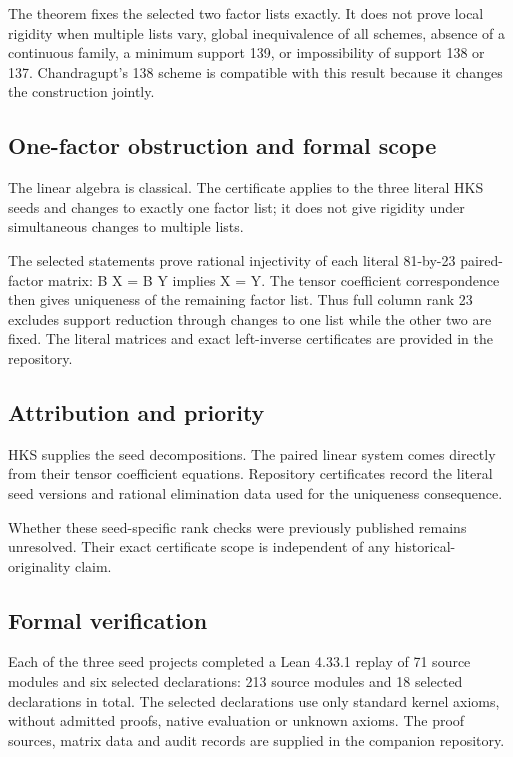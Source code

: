 \documentclass[11pt,a4paper]{article}
\begin{document}
The theorem fixes the selected two factor lists exactly. It does not prove local rigidity when multiple lists vary, global inequivalence of all schemes, absence of a continuous family, a minimum support 139, or impossibility of support 138 or 137. Chandragupt's 138 scheme is compatible with this result because it changes the construction jointly.

\subsection{One-factor obstruction and formal scope}
The linear algebra is classical. The certificate applies to the three literal HKS seeds and changes to exactly one factor list; it does not give rigidity under simultaneous changes to multiple lists.

The selected statements prove rational injectivity of each literal 81-by-23 paired-factor matrix: B X = B Y implies X = Y. The tensor coefficient correspondence then gives uniqueness of the remaining factor list. Thus full column rank 23 excludes support reduction through changes to one list while the other two are fixed. The literal matrices and exact left-inverse certificates are provided in the repository.

\subsection{Attribution and priority}
HKS supplies the seed decompositions. The paired linear system comes directly from their tensor coefficient equations. Repository certificates record the literal seed versions and rational elimination data used for the uniqueness consequence.

Whether these seed-specific rank checks were previously published remains unresolved. Their exact certificate scope is independent of any historical-originality claim.

\subsection{Formal verification}
Each of the three seed projects completed a Lean 4.33.1 replay of 71 source modules and six selected declarations: 213 source modules and 18 selected declarations in total. The selected declarations use only standard kernel axioms, without admitted proofs, native evaluation or unknown axioms. The proof sources, matrix data and audit records are supplied in the companion repository.
\end{document}
